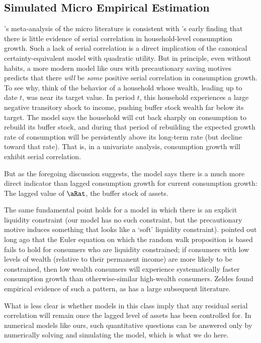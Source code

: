 \subsection{Simulated Micro Empirical Estimation} \label{subsec:simMicro}

\cite{hrsHabit}'s meta-analysis of the micro literature is consistent with \cite{dynanHabits}'s early finding that there is little evidence of serial correlation in household-level consumption growth.  Such a lack of serial correlation is a direct implication of the canonical \cite{hallRandomWalk} certainty-equivalent model with quadratic utility.  But in principle, even without habits, a more modern model like ours with precautionary saving motives predicts that there {\it will} be {\it some} positive serial correlation in consumption growth.  To see why, think of the behavior of a household whose wealth, leading up to date $t$, was near its target value.
In period $t$, this household experiences a large negative transitory shock to income, pushing buffer stock wealth far below its target.  The model says the household will cut back sharply on consumption to rebuild its buffer stock, and during that period of rebuilding the expected growth rate of consumption will be persistently above its long-term rate (but decline toward that rate).  That is, in a univariate analysis, consumption growth will exhibit serial correlation.

But as the foregoing discussion suggests, the model says there is a much more direct indicator than lagged consumption growth for current consumption growth:  The lagged value of $\aRat$, the buffer stock of assets.

The same fundamental point holds for a model in which there is an explicit liquidity constraint (our model has no such constraint, but the precautionary motive induces something that looks like a `soft' liquidity constraint).  \cite{zeldes:jpe} pointed out long ago that the Euler equation on which the random walk proposition is based fails to hold for consumers who are liquidity constrained; if consumers with low levels of wealth (relative to their permanent income) are more likely to be constrained, then low wealth consumers will experience systematically faster consumption growth than otherwise-similar high-wealth consumers.  Zeldes found empirical evidence of such a pattern, as has a large subsequent literature.

What is less clear is whether models in this class imply that any residual serial correlation will remain once the lagged level of assets has been controlled for.  In numerical models like ours, such quantitative questions can be answered only by numerically solving and simulating the model, which is what we do here.

